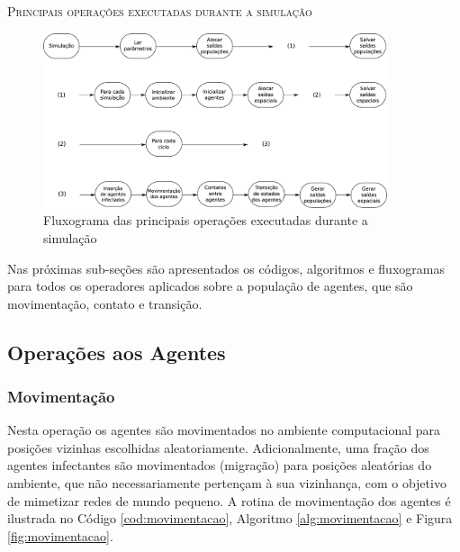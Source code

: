 \newpage

\begin{algorithm}[H]
 \SetAlgoLined
 
 \caption{\textsc{Principais operações executadas durante a simulação}} 
 \label{alg:rotina_principal}
\end{algorithm}

\begin{figure}[H]
  \centering
  \includegraphics[width=0.9\textwidth]{Figuras/EstruturasDadosEstrategias/main.eps}
  \caption{Fluxograma das principais operações executadas durante a simulação}
  \label{fig:rotina_principal}
\end{figure} 

Nas próximas sub-seções são apresentados os códigos, algoritmos e fluxogramas para todos os operadores aplicados sobre a população de agentes, que são movimentação, contato e transição. 

\newpage

\subsection{Operações aos Agentes}

\subsubsection{Movimentação}

Nesta operação os agentes são movimentados no ambiente computacional para posições vizinhas escolhidas aleatoriamente. Adicionalmente, uma fração dos agentes infectantes são movimentados (migração) para posições aleatórias do ambiente, que não necessariamente pertençam à sua vizinhança, com o objetivo de mimetizar redes de mundo pequeno. A rotina de movimentação dos agentes é ilustrada no Código \ref{cod:movimentacao}, Algoritmo \ref{alg:movimentacao} e Figura \ref{fig:movimentacao}.  

